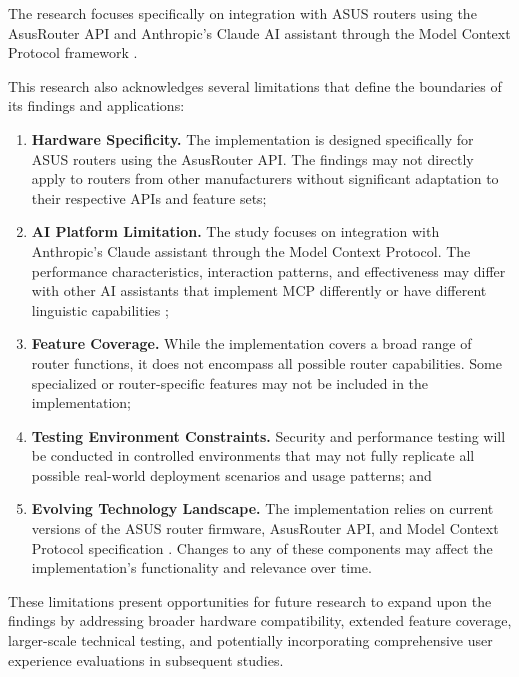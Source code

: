 The research focuses specifically on integration with ASUS routers using the AsusRouter API and Anthropic's Claude AI assistant through the Model Context Protocol framework \cite{mcp_intro}.

This research also acknowledges several limitations that define the boundaries of its findings and applications:

\begin{enumerate}
\item \textbf{Hardware Specificity.} The implementation is designed specifically for ASUS routers using the AsusRouter API. The findings may not directly apply to routers from other manufacturers without significant adaptation to their respective APIs and feature sets;

\item \textbf{AI Platform Limitation.} The study focuses on integration with Anthropic's Claude assistant through the Model Context Protocol. The performance characteristics, interaction patterns, and effectiveness may differ with other AI assistants that implement MCP differently or have different linguistic capabilities \cite{mcp_byteplus};

\item \textbf{Feature Coverage.} While the implementation covers a broad range of router functions, it does not encompass all possible router capabilities. Some specialized or router-specific features may not be included in the implementation;

\item \textbf{Testing Environment Constraints.} Security and performance testing will be conducted in controlled environments that may not fully replicate all possible real-world deployment scenarios and usage patterns; and

\item \textbf{Evolving Technology Landscape.} The implementation relies on current versions of the ASUS router firmware, AsusRouter API, and Model Context Protocol specification \cite{mcp_developer}. Changes to any of these components may affect the implementation's functionality and relevance over time.
\end{enumerate}
These limitations present opportunities for future research to expand upon the findings by addressing broader hardware compatibility, extended feature coverage, larger-scale technical testing, and potentially incorporating comprehensive user experience evaluations in subsequent studies.

